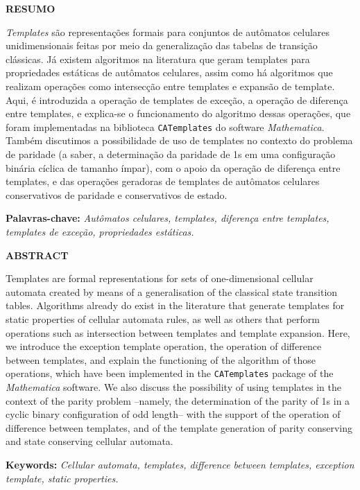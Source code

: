 \newpage
\thispagestyle{plain}
\begin{center}
\large
\textbf{RESUMO}
\end{center}
\textit{Templates} são representações formais para conjuntos de autômatos celulares unidimensionais feitas por meio da generalização das tabelas de transição clássicas. Já existem algoritmos na literatura que geram templates para propriedades estáticas de autômatos celulares, assim como há algoritmos que realizam operações como intersecção entre templates e expansão de template. Aqui, é introduzida a operação de templates de exceção, a operação de diferença entre templates, e explica-se o funcionamento do algoritmo dessas operações, que foram implementadas na biblioteca \texttt{CATemplates} do software \textit{Mathematica}. Também discutimos a possibilidade de uso de templates no contexto do problema de paridade (a saber, a determinação da paridade de 1s em uma configuração binária cíclica de tamanho ímpar), com o apoio da operação de diferença entre templates, e das operações geradoras de templates de autômatos celulares conservativos de paridade e conservativos de estado.
\\[0.5cm]																																																																																																																																																																																																																																																			
\begin{flushleft}
{\bf Palavras-chave:} {\it Autômatos celulares, templates, diferença entre templates, templates de exceção, propriedades estáticas.}
\end{flushleft}


\newpage
\thispagestyle{plain}
\begin{center}
\large  
\textbf{ABSTRACT}
\end{center}
Templates are formal representations for sets of one-dimensional cellular automata created by means of a generalisation of the classical state transition tables. Algorithms already do exist in the literature that generate templates for static properties of cellular automata rules, as well as others that perform operations such as intersection between templates and template expansion. Here, we introduce the exception template operation, the operation of difference between templates, and explain the functioning of the algorithm of those operations, which have been implemented in the \texttt{CATemplates} package of the \textit{Mathematica} software. We also discuss the possibility of using templates in the context of the parity problem --namely, the determination of the parity of 1s in a cyclic binary configuration of odd length-- with the support of the operation of difference between templates, and of the template generation of parity conserving and state conserving cellular automata.
\\[0.5cm]
\begin{flushleft}
{\bf Keywords:} {\it Cellular automata, templates, difference between templates, exception template, static properties.}
\end{flushleft}